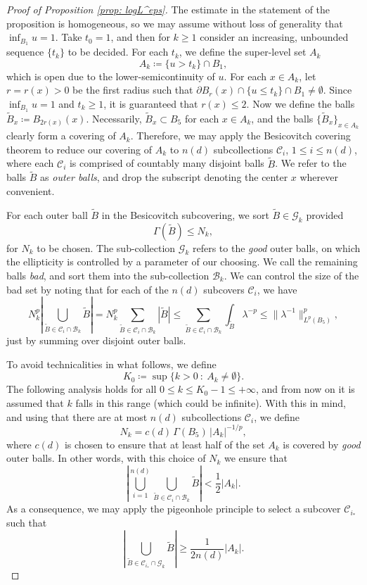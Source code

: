 \documentclass[reqno]{amsart}
\numberwithin{equation}{section}
\numberwithin{equation}{section}
\begin{document}
\begin{proof}[Proof of Proposition \ref{prop: logL^eps}]
The estimate in the statement of the proposition is homogeneous, so we may assume without loss of generality that $\inf_{B_1}u=1$. Take $t_0=1$, and then for $k \ge 1$ consider an increasing, unbounded sequence $\{t_k\}$ to be decided. For each $t_k$, we define the super-level set $A_k$ 
$$
A_k \coloneqq \{u>t_k\} \cap B_1,$$
which is open due to the lower-semicontinuity of $u$. For each $x \in A_k$, let $r = r(x)>0$ be the first radius such that $\partial B_{r}(x) \cap \{u\le t_k\} \cap B_1 \neq \emptyset$. Since $\inf_{B_1}u=1$ and $t_k \ge 1$, it is guaranteed that $r(x) \le 2$. Now we define the balls $\widetilde{B}_x \coloneqq B_{2r(x)}(x)$. Necessarily, $\widetilde{B}_x \subset B_5$ for each $x \in A_k$, and the balls $\{\widetilde{B}_x\}_{x \in A_k}$ clearly form a covering of $A_k$. Therefore, we may apply the Besicovitch covering theorem to reduce our covering of $A_k$ to $n(d)$ subcollections $\mathcal{C}_i$, $1\le i \le n(d)$, where each $\mathcal{C}_i$ is comprised of countably many disjoint balls $\widetilde{B}$. We refer to the balls $\widetilde{B}$ as \textit{outer balls}, and drop the subscript denoting the center $x$ wherever convenient. 

For each outer ball $\widetilde B$ in the Besicovitch subcovering, we sort $\widetilde B \in \mathcal{G}_k$ provided
$$
\Gamma(\widetilde B) \le N_k,
$$
for $N_k$ to be chosen. The sub-collection $\mathcal{G}_k$ refers to the \textit{good} outer balls, on which the ellipticity is controlled by a parameter of our choosing. We call the remaining balls \textit{bad}, and sort them into the sub-collection $\mathcal{B}_k$. We can control the size of the bad set by noting that for each of the $n(d)$ subcovers $\mathcal{C}_i$, we have
$$
N_k^p \left|\bigcup_{\widetilde B \in \mathcal{C}_i \cap \mathcal{B}_k}\widetilde B\right|
=
N_k^p \sum_{\widetilde B \in \mathcal{C}_i \cap \mathcal{B}_k} |\widetilde B|
\le
\sum_{\widetilde B \in \mathcal{C}_i \cap \mathcal{B}_k} \int_{\widetilde B} \lambda^{-p}
\le
\|\lambda^{-1}\|_{L^p(B_5)}^p,
$$
just by summing over disjoint outer balls.

To avoid technicalities in what follows, we define
$$
K_0 \coloneqq \sup\{k>0 \ : \ A_k \neq \emptyset\}.
$$
The following analysis holds for all $0 \le k \le K_0-1 \le +\infty$, and from now on it is assumed that $k$ falls in this range (which could be infinite). With this in mind, and using that there are at most $n(d)$ subcollections $\mathcal{C}_i$, we define
$$
N_k = c(d)\,\Gamma(B_5)\,|A_k|^{-1/p},
$$
where $c(d)$ is chosen to ensure that at least half of the set $A_k$ is covered by \textit{good} outer balls. In other words, with this choice of $N_k$ we ensure that
$$
\left|\bigcup_{i=1}^{n(d)} \bigcup_{\widetilde B \in \mathcal{C}_i \cap \mathcal{B}_k}\widetilde B\right|
<
\frac12|A_k|.
$$
As a consequence, we may apply the pigeonhole principle to select a subcover $\mathcal{C}_{i_*}$ such that
\begin{equation}
\label{eq: subcoverselection}
\left|\bigcup_{\widetilde B \in \mathcal{C}_{i_*} \cap \mathcal{G}_k}\widetilde B\right|
\ge
\frac{1}{2n(d)}|A_k|.
\end{equation}


\end{proof}
\end{document}
